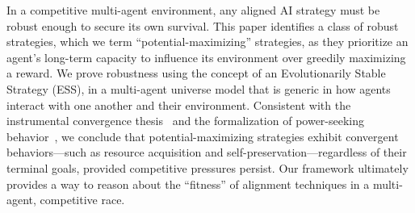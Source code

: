 In a competitive multi-agent environment, any aligned AI strategy must be robust
enough to secure its own survival. This paper identifies a class of robust
strategies, which we 
term ``potential-maximizing'' strategies, as they prioritize an
agent's long-term capacity to influence its environment over greedily maximizing
a reward. We prove robustness using the concept of an Evolutionarily Stable Strategy (ESS),
in a multi-agent universe model that is generic in how agents interact with one
another and their environment. Consistent with the instrumental convergence
thesis~\citep{bostrom2012} and the formalization of power-seeking
behavior~\citep{powerseeking}, we conclude that potential-maximizing strategies
exhibit convergent behaviors---such as resource acquisition and
self-preservation---regardless of their terminal goals, provided competitive
pressures persist. Our framework ultimately provides a way to reason about the
``fitness'' of alignment techniques in a multi-agent, competitive race.

